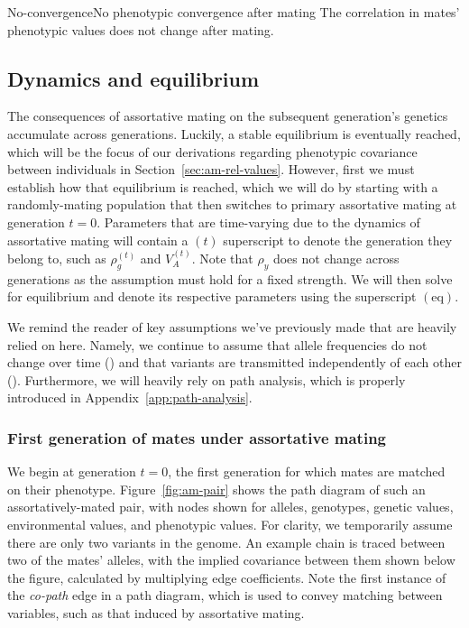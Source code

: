 \documentclass[12pt]{article}
\numberwithin{equation}{section}
\begin{document}
\begin{assumption}{No-convergence}{No phenotypic convergence after mating}
The correlation in mates' phenotypic values does not change after mating.
\end{assumption}

\subsection{Dynamics and equilibrium}\label{sec:am-dynamics}

The consequences of assortative mating on the subsequent generation's genetics accumulate across generations.
Luckily, a stable equilibrium is eventually reached, which will be the focus of our derivations regarding phenotypic covariance between individuals in Section~\ref{sec:am-rel-values}.
However, first we must establish how that equilibrium is reached, which we will do by starting with a randomly-mating population that then switches to primary assortative mating at generation $t=0$.
Parameters that are time-varying due to the dynamics of assortative mating will contain a $(t)$ superscript to denote the generation they belong to, such as $\rho_g^{(t)}$ and $V_A^{(t)}$.
Note that $\rho_y$ does not change across generations as the  assumption must hold for a fixed strength.
We will then solve for equilibrium and denote its respective parameters using the superscript $(\mathrm{eq})$.

We remind the reader of key assumptions we've previously made that are heavily relied on here.
Namely, we continue to assume that allele frequencies do not change over time () and that variants are transmitted independently of each other ().
Furthermore, we will heavily rely on path analysis, which is properly introduced in Appendix~\ref{app:path-analysis}.

\subsubsection{First generation of mates under assortative mating}\label{sec:am-first-gen-mates}
We begin at generation $t=0$, the first generation for which mates are matched on their phenotype.
Figure~\ref{fig:am-pair} shows the path diagram of such an assortatively-mated pair, with nodes shown for alleles, genotypes, genetic values, environmental values, and phenotypic values.
For clarity, we temporarily assume there are only two variants in the genome.
An example chain is traced between two of the mates' alleles, with the implied covariance between them shown below the figure, calculated by multiplying edge coefficients.
Note the first instance of the \emph{co-path} edge in a path diagram, which is used to convey matching between variables, such as that induced by assortative mating.
\end{document}
